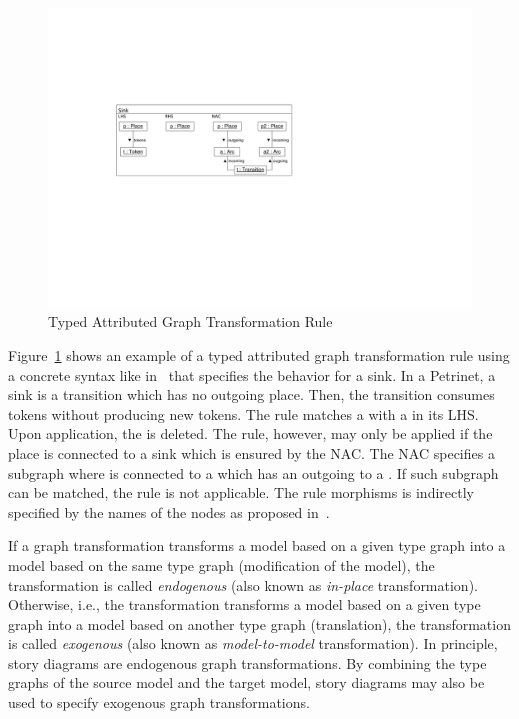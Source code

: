 \begin{figure}[htb]
  \centering
  \includegraphics[scale=1]{figures/TypedGTRule}
  \caption{Typed Attributed Graph Transformation Rule}
  \label{fig:typedGTRule}
\end{figure}

Figure~\ref{fig:typedGTRule} shows an example of a typed attributed graph transformation rule using a concrete syntax like in~\cite{EEPT06} that specifies the behavior for a sink.
In a Petrinet, a sink is a transition which has no outgoing place.
Then, the transition consumes tokens without producing new tokens.
The rule matches a  with a  in its LHS.
Upon application, the  is deleted.
The rule, however, may only be applied if the place  is connected to a sink which is ensured by the NAC.
The NAC specifies a subgraph where  is connected to a  which has an outgoing  to a .
If such subgraph can be matched, the rule is not applicable.
The rule morphisms is indirectly specified by the names of the nodes as proposed in~\cite{EEPT06}.

If a graph transformation transforms a model based on a given type graph into a model based on the same type graph (modification of the model),
the transformation is called \emph{endogenous} (also known as \emph{in-place} transformation).
Otherwise, i.e., the transformation transforms a model based on a given type graph into a model based on another type graph (translation),
the transformation is called \emph{exogenous} (also known as \emph{model-to-model} transformation).
In principle, story diagrams are endogenous graph transformations.
By combining the type graphs of the source model and the target model, story diagrams may also be used to specify exogenous graph transformations.


